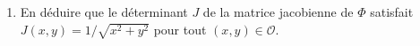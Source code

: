 \documentclass[a4paper]{tp_um}
\begin{document}
\begin{enumerate}


\item En d\'eduire que le déterminant $J$ de la matrice jacobienne de $\Phi$ satisfait $J(x,y) = 1/\sqrt{x^2+y^2}$ pour tout
$(x,y) \in \mathcal O.$


\end{enumerate}
\end{document}
